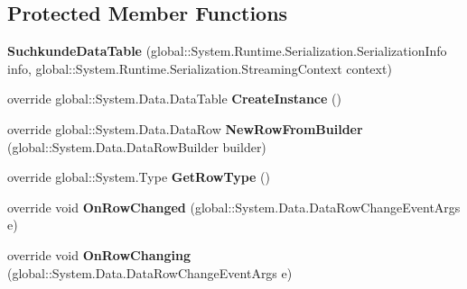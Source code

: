 \subsection*{Protected Member Functions}
\begin{DoxyCompactItemize}
\item 
{\bfseries Suchkunde\+Data\+Table} (global\+::\+System.\+Runtime.\+Serialization.\+Serialization\+Info info, global\+::\+System.\+Runtime.\+Serialization.\+Streaming\+Context context)\hypertarget{class_products_1_1_data_1_1ds_sage_1_1_suchkunde_data_table_ab97ec4c3ff303800142d27578a752924}{}\label{class_products_1_1_data_1_1ds_sage_1_1_suchkunde_data_table_ab97ec4c3ff303800142d27578a752924}

\item 
override global\+::\+System.\+Data.\+Data\+Table {\bfseries Create\+Instance} ()\hypertarget{class_products_1_1_data_1_1ds_sage_1_1_suchkunde_data_table_af198c0425c0bacb3f00cc3afc36dcd21}{}\label{class_products_1_1_data_1_1ds_sage_1_1_suchkunde_data_table_af198c0425c0bacb3f00cc3afc36dcd21}

\item 
override global\+::\+System.\+Data.\+Data\+Row {\bfseries New\+Row\+From\+Builder} (global\+::\+System.\+Data.\+Data\+Row\+Builder builder)\hypertarget{class_products_1_1_data_1_1ds_sage_1_1_suchkunde_data_table_aea4776b654483d9b62cb179c5bfa0a57}{}\label{class_products_1_1_data_1_1ds_sage_1_1_suchkunde_data_table_aea4776b654483d9b62cb179c5bfa0a57}

\item 
override global\+::\+System.\+Type {\bfseries Get\+Row\+Type} ()\hypertarget{class_products_1_1_data_1_1ds_sage_1_1_suchkunde_data_table_af06a589cd90393cf08f9fa8dfc1916fc}{}\label{class_products_1_1_data_1_1ds_sage_1_1_suchkunde_data_table_af06a589cd90393cf08f9fa8dfc1916fc}

\item 
override void {\bfseries On\+Row\+Changed} (global\+::\+System.\+Data.\+Data\+Row\+Change\+Event\+Args e)\hypertarget{class_products_1_1_data_1_1ds_sage_1_1_suchkunde_data_table_a54b3e63d9b96ae5c6c181ae166a55288}{}\label{class_products_1_1_data_1_1ds_sage_1_1_suchkunde_data_table_a54b3e63d9b96ae5c6c181ae166a55288}

\item 
override void {\bfseries On\+Row\+Changing} (global\+::\+System.\+Data.\+Data\+Row\+Change\+Event\+Args e)\hypertarget{class_products_1_1_data_1_1ds_sage_1_1_suchkunde_data_table_aa4e2baec595046ce4064b57b2c6eafc4}{}\label{class_products_1_1_data_1_1ds_sage_1_1_suchkunde_data_table_aa4e2baec595046ce4064b57b2c6eafc4}


\end{DoxyCompactItemize}
